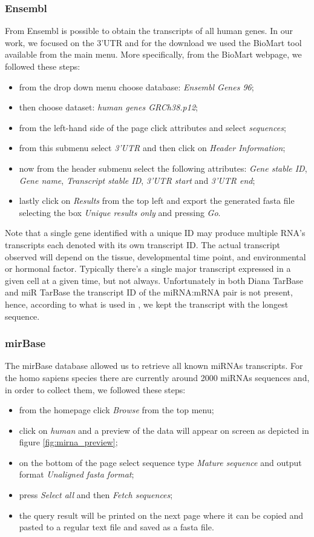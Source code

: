 \subsubsection{Ensembl}
From Ensembl\cite{ensembl} is possible to obtain the transcripts of all human genes. In our work, we focused on the 3'UTR and for the download we used the BioMart tool available from the main menu. More specifically, from the BioMart webpage, we followed these steps:
\begin{itemize}
	\item from the drop down menu choose database: \emph{Ensembl Genes 96};
	\item then choose dataset: \emph{human genes GRCh38.p12};
	\item from the left-hand side of the page click attributes and select \emph{sequences};
	\item from this submenu select \emph{3'UTR} and then click on \emph{Header Information};
	\item now from the header submenu select the following attributes: \emph{Gene stable ID}, \emph{Gene name}, \emph{Transcript stable ID}, \emph{3'UTR start} and \emph{3'UTR end};
	\item lastly click on \emph{Results} from the top left and export the generated fasta file selecting the box \emph{Unique results only} and pressing \emph{Go}.
\end{itemize}
Note that a single gene identified with a unique ID may produce multiple RNA's transcripts each denoted with its own transcript ID. The actual transcript observed will depend on the tissue, developmental time point, and environmental or hormonal factor. Typically there's a single major transcript expressed in a given cell at a given time, but not always. Unfortunately in both Diana TarBase and miR TarBase the transcript ID of the miRNA:mRNA pair is not present, hence, according to what is used in \cite{deep_mirtar}, we kept the transcript with the longest sequence.  

\subsubsection{mirBase}
The mirBase database allowed us to retrieve all known miRNAs transcripts. For the homo sapiens species there are currently around 2000 miRNAs sequences and, in order to collect them, we followed these steps:
\begin{itemize}
	\item from the homepage click \emph{Browse} from the top menu;
	\item click on \emph{human} and a preview of the data will appear on screen as depicted in figure \ref{fig:mirna_preview};
	\item on the bottom of the page select sequence type \emph{Mature sequence} and output format \emph{Unaligned fasta format};
	\item press \emph{Select all} and then \emph{Fetch sequences}; 
	\item the query result will be printed on the next page where it can be copied and pasted to a regular text file and saved as a fasta file.
\end{itemize}
 
